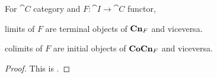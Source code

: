 \begin{proposition}
  For \(\cat C\) category and \(F : \cat I \to \cat C\) functor,
  \begin{tcbitem}
  \item limits of \(F\) are terminal objects of \(\mathbf{Cn}_F\) and
    viceversa.
  \item colimits of \(F\) are initial objects of \(\mathbf{CoCn}_F\) and
    viceversa.
  \end{tcbitem}
\end{proposition}

\begin{proof}
  This is .
\end{proof}

